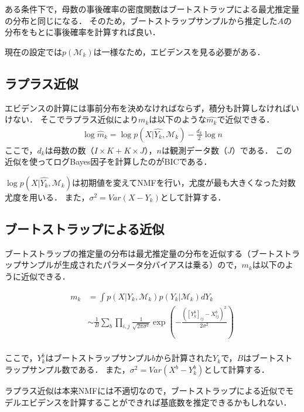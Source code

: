 ある条件下で，母数の事後確率の密度関数はブートストラップによる最尤推定量の分布と同じになる．
そのため，ブートストラップサンプルから推定した$A$の分布をもとに事後確率を計算すれば良い．

現在の設定では$p(\mathcal{M}_k)$は一様なため，エビデンスを見る必要がある．

\subsection{ラプラス近似}
エビデンスの計算には事前分布を決めなければならず，積分も計算しなければいけない．
そこでラプラス近似により$m_k$は以下のような$\hat{m_k}$で近似できる．
\begin{align}
	\log \hat{m}_k = \log p(X | \hat{Y_k}, \mathcal{M}_k) - \frac{d_k}{2} \log n
	\label{eq:simm}
\end{align}
ここで，$d_k$は母数の数（$I \times K + K \times J$），$n$は観測データ数（$J$）である．
この近似を使ってログBayes因子を計算したのがBICである．

$\log p(X | \hat{Y_k}, \mathcal{M}_k)$は初期値を変えてNMFを行い，尤度が最も大きくなった対数尤度を用いる．
また，$\sigma^2 = Var(X - Y_k)$として計算する．

\subsection{ブートストラップによる近似}
ブートストラップの推定量の分布は最尤推定量の分布を近似する（ブートストラップサンプルが生成されたパラメータ分バイアスは乗る）ので，$m_k$は以下のように近似できる．

\begin{align}
	m_k &= \int p(X | Y_k, \mathcal{M}_k) p(Y_k| \mathcal{M}_k) dY_k \\
	&\sim \frac{1}{B} \sum_b \prod_{i,j} \frac{1}{\sqrt{2 \pi \sigma^2}} \exp\left(-\frac{([Y_k^b]_{ij} - X^b_{ij})^2}{2 \sigma^2} \right) \\
	\label{eq:simm2}
\end{align}

ここで，$Y_k^b$はブートストラップサンプル$b$から計算された$Y_k$で，$B$はブートストラップサンプル数である．
また，$\sigma^2 = Var(X^b - Y^b_k)$として計算する．

ラプラス近似は本来NMFには不適切なので，ブートストラップによる近似でモデルエビデンスを計算することができれば基底数を推定できるかもしれない．
